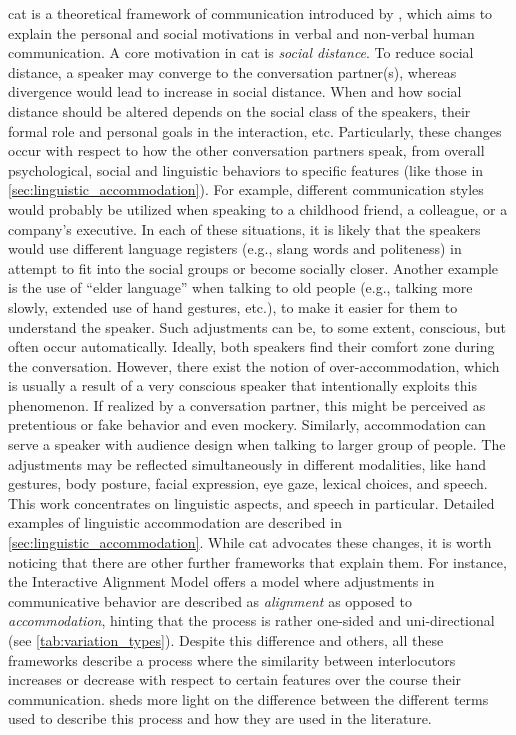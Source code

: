 \Acf{cat} is a theoretical framework of communication introduced by \citet{Giles1973mobility, Giles1991CAT, Giles2007CAT}, which aims to explain the personal and social motivations in verbal and non-verbal human communication.
A core motivation in \ac{cat} is \emph{social distance}.
To reduce social distance, a speaker may converge to the conversation partner(s), whereas divergence would lead to increase in social distance.
When and how social distance should be altered depends on the social class of the speakers, their formal role and personal goals in the interaction, etc.
Particularly, these changes occur with respect to how the other conversation partners speak, from overall psychological, social and linguistic behaviors to specific features (like those in \cref{sec:linguistic_accommodation}).
For example, different communication styles would probably be utilized when speaking to a childhood friend, a colleague, or a company's executive.
In each of these situations, it is likely that the speakers would use different language registers (e.g., slang words and politeness) in attempt to fit into the social groups or become socially closer.
Another example is the use of \enquote{elder language} when talking to old people (e.g., talking more slowly, extended use of hand gestures, etc.), to make it easier for them to understand the speaker.
Such adjustments can be, to some extent, conscious, but often occur automatically.
Ideally, both speakers find their comfort zone during the conversation.
However, there exist the notion of over-accommodation, which is usually a result of a very conscious speaker that intentionally exploits this phenomenon.
If realized by a conversation partner, this might be perceived as pretentious or fake behavior and even mockery.
Similarly, accommodation can serve a speaker with audience design when talking to larger group of people.
The adjustments may be reflected simultaneously in different modalities, like hand gestures, body posture, facial expression, eye gaze, lexical choices, and speech.
This work concentrates on linguistic aspects, and speech in particular.
Detailed examples of linguistic accommodation are described in \cref{sec:linguistic_accommodation}.
While \ac{cat} advocates these changes, it is worth noticing that there are other further frameworks that explain them.
For instance, the Interactive Alignment Model \citep{Pickering2004behavioral, Pickering2013integrated} offers a model where adjustments in communicative behavior are described as \emph{alignment} as opposed to \emph{accommodation}, hinting that the process is rather one-sided and uni-directional (see \cref{tab:variation_types}).
Despite this difference and others, all these frameworks describe a process where the similarity between interlocutors increases or decrease with respect to certain features over the course their communication.
 sheds more light on the difference between the different terms used to describe this process and how they are used in the literature.

